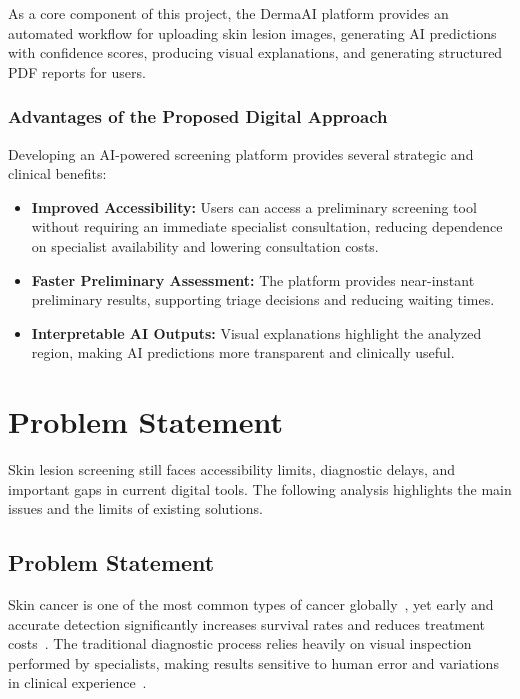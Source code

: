 	As a core component of this project, the DermaAI platform provides an automated workflow for uploading skin lesion images, generating AI predictions with confidence scores, producing visual explanations, and generating structured PDF reports for users.
	
	\subsubsection{Advantages of the Proposed Digital Approach}
	
	Developing an AI-powered screening platform provides several strategic and clinical
	benefits:
	
	\begin{itemize}
	  \item \textbf{Improved Accessibility:} Users can access a preliminary screening tool
	        without requiring an immediate specialist consultation, reducing dependence on
	        specialist availability and lowering consultation costs.
	  \item \textbf{Faster Preliminary Assessment:} The platform provides near-instant
	        preliminary results, supporting triage decisions and reducing waiting times.
	  \item \textbf{Interpretable AI Outputs:} Visual explanations highlight the analyzed
	        region, making AI predictions more transparent and clinically useful.
	\end{itemize}
	
	\section{Problem Statement}
	
	Skin lesion screening still faces accessibility limits, diagnostic delays, and important gaps
	in current digital tools. The following analysis highlights the main issues and the limits
	of existing solutions.
	
	\subsection{Problem Statement}
	
	Skin cancer is one of the most common types of cancer globally~\cite{SkinCancerOrg},
	yet early and accurate detection significantly increases survival rates and reduces
	treatment costs~\cite{Abdalla2024}. The traditional diagnostic process relies heavily
	on visual inspection performed by specialists, making results sensitive to human error
	and variations in clinical experience~\cite{Kassem2021}.
	
